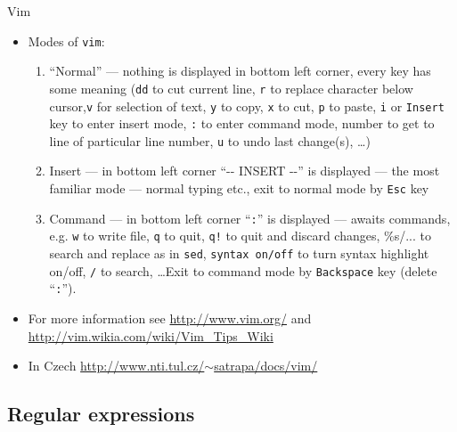 \documentclass[hyperref={bookmarks=true, unicode=true, colorlinks=true, pdftitle={Linux, command line and MetaCentrum}, plainpages=false, pdfauthor={Vojtech Zeisek}, pdfsubject={Course about use of Linux command line, writing shell scripts and using MetaCentrum of CESNET}, pdfcreator={XeLaTeX, http://www.xelatex.org/}, pdfkeywords={Linux, GNU, BASH, shell, command line, MetaCentrum}, linkcolor=Sienna, anchorcolor=black, citecolor=green, filecolor=magenta, menucolor=Sienna, urlcolor=cyan, pdftex}, compress, ucs, xelatex, xcolor=svgnames, 11pt]{beamer}
\begin{document}
\begin{frame}{Vim}
\begin{itemize}
 \item Modes of \texttt{vim}:
  \begin{enumerate}
   \item ``Normal'' --- nothing is displayed in bottom left corner, every key has some meaning (\texttt{dd} to cut current line, \texttt{r} to replace character below cursor,\texttt{v} for selection of text, \texttt{y} to copy, \texttt{x} to cut, \texttt{p} to paste, \texttt{i} or \texttt{Insert} key to enter insert mode, \texttt{:} to enter command mode, number to get to line of particular line number, \texttt{u} to undo last change(s), \ldots)
   \item Insert --- in bottom left corner ``-{-} INSERT {-}-'' is displayed --- the most familiar mode --- normal typing etc., exit to normal mode by \texttt{Esc} key
   \item Command --- in bottom left corner ``\texttt{:}'' is displayed --- awaits commands, e.g. \texttt{w} to write file, \texttt{q} to quit, \texttt{q!} to quit and discard changes, \%s/... to search and replace as in \texttt{sed}, \texttt{syntax on/off} to turn syntax highlight on/off, \texttt{/} to search, \ldots Exit to command mode by \texttt{Backspace} key (delete ``\texttt{:}'').
  \end{enumerate}
  \item For more information see \href{http://www.vim.org/}{http://www.vim.org/} and \href{http://vim.wikia.com/wiki/Vim_Tips_Wiki}{http://vim.wikia.com/wiki/Vim\_Tips\_Wiki}
  \item In Czech \href{http://www.nti.tul.cz/~satrapa/docs/vim/}{http://www.nti.tul.cz/$\sim$satrapa/docs/vim/}
\end{itemize}
\end{frame}

\subsection{Regular expressions}
\end{document}
